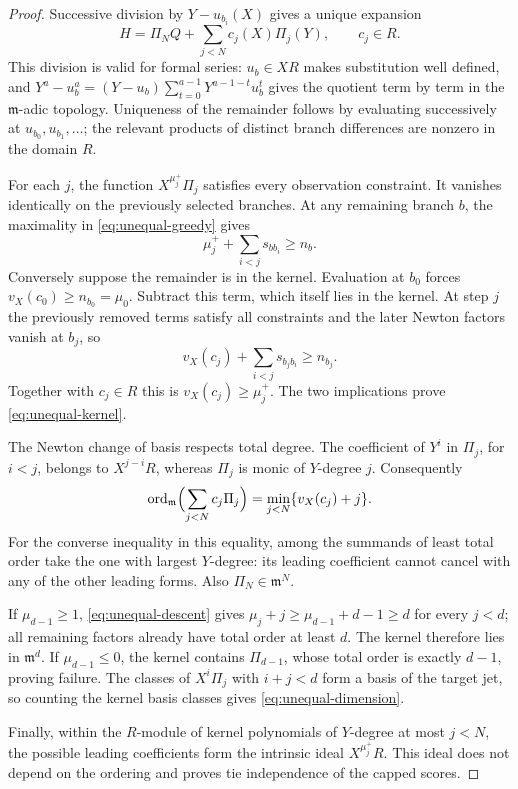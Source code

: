 \begin{proof}
Successive division by $Y-u_{b_i}(X)$ gives a unique expansion
\[
 H=\Pi_N Q+\sum_{j<N}c_j(X)\Pi_j(Y),\qquad c_j\in R.
\]
This division is valid for formal series: $u_b\in XR$ makes substitution
well defined, and
$Y^a-u_b^a=(Y-u_b)\sum_{t=0}^{a-1}Y^{a-1-t}u_b^t$ gives the quotient term by
term in the $\mathfrak m$-adic topology.  Uniqueness of the remainder follows
by evaluating successively at $u_{b_0},u_{b_1},\ldots$; the relevant products
of distinct branch differences are nonzero in the domain $R$.

For each $j$, the function $X^{\mu_j^+}\Pi_j$ satisfies every observation
constraint.  It vanishes identically on the previously selected branches.
At any remaining branch $b$, the maximality in
\eqref{eq:unequal-greedy} gives
\[
 \mu_j^+ +\sum_{i<j}s_{bb_i}\ge n_b.
\]
Conversely suppose the remainder is in the kernel.  Evaluation at $b_0$
forces $v_X(c_0)\ge n_{b_0}=\mu_0$.  Subtract this term, which itself lies
in the kernel.  At step $j$ the previously removed terms satisfy all
constraints and the later Newton factors vanish at $b_j$, so
\[
 v_X(c_j)+\sum_{i<j}s_{b_jb_i}\ge n_{b_j}.
\]
Together with $c_j\in R$ this is $v_X(c_j)\ge\mu_j^+$.  The two implications
prove \eqref{eq:unequal-kernel}.

The Newton change of basis respects total degree.  The coefficient of $Y^i$
in $\Pi_j$, for $i<j$, belongs to $X^{j-i}R$, whereas $\Pi_j$ is monic of
$Y$-degree $j$.  Consequently
\[
 \operatorname{ord}_{\mathfrak m}\Bigl(\sum_{j<N}c_j\Pi_j\Bigr)
   =\min_{j<N}\{v_X(c_j)+j\}.
\]
For the converse inequality in this equality, among the summands of least
total order take the one with largest $Y$-degree: its leading coefficient
cannot cancel with any of the other leading forms.  Also
$\Pi_N\in\mathfrak m^N$.

If $\mu_{d-1}\ge1$, \eqref{eq:unequal-descent} gives
$\mu_j+j\ge\mu_{d-1}+d-1\ge d$ for every $j<d$; all remaining factors already
have total order at least $d$.  The kernel therefore lies in
$\mathfrak m^d$.  If $\mu_{d-1}\le0$, the kernel contains $\Pi_{d-1}$, whose
total order is exactly $d-1$, proving failure.  The classes of
$X^i\Pi_j$ with $i+j<d$ form a basis of the target jet, so counting the
kernel basis classes gives \eqref{eq:unequal-dimension}.

Finally, within the $R$-module of kernel polynomials of $Y$-degree at most
$j<N$, the possible leading coefficients form the intrinsic ideal
$X^{\mu_j^+}R$.  This ideal does not depend on the ordering and proves
tie independence of the capped scores.
\end{proof}

